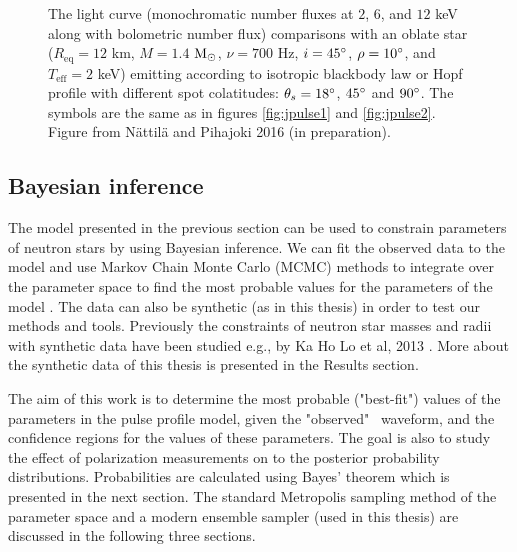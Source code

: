 \documentclass{wihuri}
\def\msun{{\rm M_{\odot}}}
\def\thetas{\theta_{s}}
\begin{document}
\begin{figure}
\centerline{}
\caption{The light curve (monochromatic number fluxes at $2$, $6$, and $12$ keV along with bolometric number flux) comparisons with an oblate star ($R_{\mathrm{eq}} = 12$ km, $M = 1.4$ $\msun$, $\nu = 700$ Hz, $i = 45 \degree$, $\rho = 10 \degree$, and $T_{\mathrm{eff}} = 2$ keV) emitting according to isotropic blackbody law or Hopf profile with different spot colatitudes: $\thetas = 18 \degree$, $45 \degree$ and $90 \degree$. The symbols are the same as in figures \ref{fig:jpulse1} and \ref{fig:jpulse2}. Figure from Nättilä and Pihajoki 2016 (in preparation).
\label{fig:jpulse3}}
\end{figure}




\subsection{Bayesian inference}



The model presented in the previous section can be used to constrain parameters of neutron stars by using Bayesian inference. We can fit the observed data to the model and use Markov Chain Monte Carlo (MCMC) methods to integrate over the parameter space to find the most probable values for the parameters of the model \cite{mc_methods_book}. The data can also be synthetic (as in this thesis) in order to test our methods and tools. %
Previously the constraints of neutron star masses and radii with synthetic data have been studied e.g., by Ka Ho Lo et al, 2013 \cite{miller}. %
More about the synthetic data of this thesis is presented in the Results section. 

The aim of this work is to determine the most probable ("best-fit") values of the parameters in the pulse profile model, given the "observed" \ 
waveform, and the confidence regions for the values of these parameters. The goal is also to study the effect of polarization measurements on to the posterior probability distributions. Probabilities are calculated using Bayes' theorem which is presented in the next section. The standard Metropolis sampling method of the parameter space and a modern ensemble sampler (used in this thesis) are discussed in the following three sections. 
\end{document}
